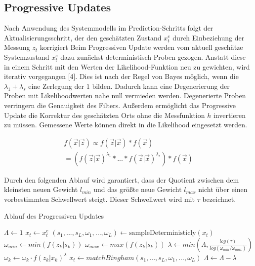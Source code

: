 \subsection{Progressive Updates}

Nach Anwendung des Systemmodells im Prediction-Schritts folgt  der Aktualisierungsschritt, der den geschätzten Zustand $x_{t}^{e}$ durch Einbeziehung der Messung $z_{t}$ korrigiert
Beim Progressiven Update werden vom aktuell geschätze Systemzustand $x_{t}^{e}$ dazu zunächst deterministisch Proben gezogen. Anstatt diese in einem Schritt mit den Werten der Likelihood-Funktion neu zu gewichten, wird iterativ vorgegangen [4]. Dies ist nach der Regel von Bayes möglich, wenn die $\lambda_1 + \lambda_s$ eine Zerlegung der $1$ bilden. Dadurch kann eine Degenerierung der Proben mit Likelihoodwerten nahe null vermieden werden. Degenerierte Proben verringern die Genauigkeit des Filters. Außerdem ermöglicht das Progressive Update die Korrektur des geschätzten Orts ohne die Messfunktion $h$ invertieren zu müssen. Gemessene Werte können direkt in die Likelihood eingesetzt werden.

\begin{align*}
	f(\vec{x} | \vec{z}) \propto f(\vec{z} | \vec{x}) * f(\vec{x})\\
	= (f(\vec{z} | \vec{x})^{\lambda_1} * ... * f(\vec{z} | \vec{x})^{\lambda_s}) * f(\vec{x})
\end{align*}


 Durch den folgenden Ablauf wird garantiert, dass der Quotient zwischen dem kleinsten neuen Gewicht
$l_{min}$ und das größte neue Gewicht $l_{max}$ nicht über einen vorbestimmten Schwellwert steigt. Dieser Schwellwert wird mit $\tau$ bezeichnet.
\\

\begin{alogrithm}
	\caption{Ablauf des Progressiven Updates}\label{update}
	\begin{algorithmic}[1]
	  \State $\Lambda\leftarrow 1$
	  \State $x_{t} \leftarrow x_{t}^{e}$
	  \State $(s_{1},...,s_{L},\omega_{1},...,\omega_{L})\leftarrow \text{sampleDeterministicly}(x_t)$
	  \State $\omega_{min}\leftarrow min(f(z_{k}|s_{k}))$
      \State $\omega_{max}\leftarrow max(f(z_{k}|s_{k}))$
	  \State $\lambda \leftarrow min(\Lambda, \frac{log(\tau)}{log(\omega_{min}/\omega_{max})})$
		\State $\omega_{k} \leftarrow \omega_{k}\cdot f(z_{k}|x_{k})^{\lambda}$
      \EndFor
	  \State $x_t \leftarrow matchBingham(s_{1},...,s_{L},\omega_{1},...,\omega_{L})$
	  \State $\Lambda\leftarrow\Lambda-\lambda$
    \EndWhile
	\EndProcedure
  \end{algorithmic}

\end{alogrithm}
